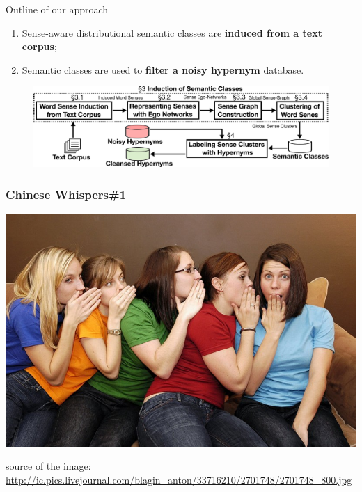 \documentclass[usenames,dvipsnames]{beamer}
\begin{document}
\begin{frame}{Outline of our approach}



\begin{enumerate}
	\item Sense-aware distributional semantic classes are \textbf{induced from a text corpus}; 
	\item Semantic classes are used to \textbf{filter a noisy hypernym} database. 
 
\end{enumerate}

\pause 


\begin{figure}
  \centering
  \includegraphics[width=.99\textwidth]{figures/outline}
  \end{figure}



\end{frame}


\begin{frame}[fragile]
\frametitle{Chinese Whispers\#1}
\begin{center}
 \includegraphics[height=0.52\textwidth]{figures/cw}
 
  {\tiny * source of the image: \url{http://ic.pics.livejournal.com/blagin_anton/33716210/2701748/2701748_800.jpg}}
 \end{center}
\end{frame}
\end{document}
